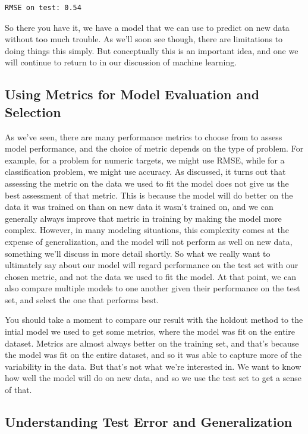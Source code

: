 \documentclass[
  letterpaper,
]{krantz}
\begin{document}
\begin{verbatim}
RMSE on test: 0.54
\end{verbatim}

So there you have it, we have a model that we can use to predict on new
data without too much trouble. As we'll soon see though, there are
limitations to doing things this simply. But conceptually this is an
important idea, and one we will continue to return to in our discussion
of machine learning.

\subsection{Using Metrics for Model Evaluation and
Selection}\label{using-metrics-for-model-evaluation-and-selection}

As we've seen, there are many performance metrics to choose from to
assess model performance, and the choice of metric depends on the type
of problem. For example, for a problem for numeric targets, we might use
RMSE, while for a classification problem, we might use accuracy. As
discussed, it turns out that assessing the metric on the data we used to
fit the model does not give us the best assessment of that metric. This
is because the model will do better on the data it was trained on than
on new data it wasn't trained on, and we can generally always improve
that metric in training by making the model more complex. However, in
many modeling situations, this complexity comes at the expense of
generalization, and the model will not perform as well on new data,
something we'll discuss in more detail shortly. So what we really want
to ultimately say about our model will regard performance on the test
set with our chosen metric, and not the data we used to fit the model.
At that point, we can also compare multiple models to one another given
their performance on the test set, and select the one that performs
best.

You should take a moment to compare our result with the holdout method
to the intial model we used to get some metrics, where the model was fit
on the entire dataset. Metrics are almost always better on the training
set, and that's because the model was fit on the entire dataset, and so
it was able to capture more of the variability in the data. But that's
not what we're interested in. We want to know how well the model will do
on new data, and so we use the test set to get a sense of that.

\subsection{Understanding Test Error and
Generalization}\label{understanding-test-error-and-generalization}
\end{document}

